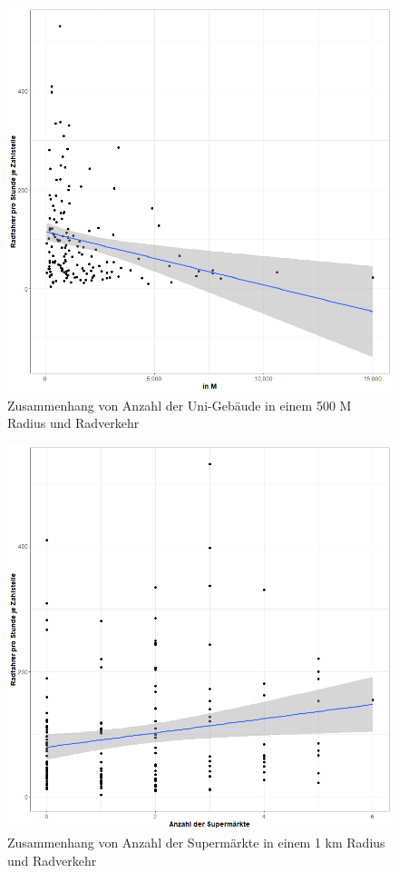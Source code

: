 \documentclass[a4paper,12pt]{thesis}
\begin{document}
\begin{figure}[!ht]
	\centering
	\includegraphics[width=\textwidth]{Plots/plot13.png}
	\caption{Zusammenhang von Anzahl der Uni-Gebäude in einem 500 M Radius und Radverkehr}
	\label{UniBuild}
\end{figure}

\begin{figure}[!ht]
	\centering
	\includegraphics[width=\textwidth]{Plots/plot14.png}
	\caption{Zusammenhang von Anzahl der Supermärkte in einem 1 km Radius und Radverkehr}
	\label{SuperMarket}
\end{figure}
\end{document}
